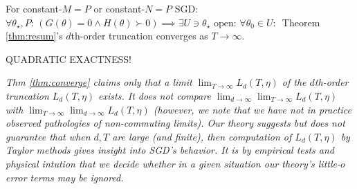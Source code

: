 {            %
            \begin{thm} \label{thm:converge}
                For constant-$M=P$ or constant-$N=P$ SGD:
                $\forall \theta_\star,P:\, (G(\theta)=0 \wedge H(\theta)\succ
                0) \implies \exists U\ni \theta_\star\,\,\text{open}:\, \forall
                \theta_0\in U:\,$
                Theorem \ref{thm:resum}'s $d$th-order truncation converges
                as $T\to \infty$.
            \end{thm}
            {\large\color{red}QUADRATIC EXACTNESS!}
            \begin{rmk}
                \emph{
                Thm \ref{thm:converge} claims only that a limit
                $\lim_{T\to\infty} L_d(T,\eta)$ of the
                $d$th-order truncation $L_d(T,\eta)$ exists.
                It does not compare $\lim_{d\to\infty}
                \lim_{T\to\infty} L_d(T,\eta)$ with $\lim_{T\to\infty}
                \lim_{d\to\infty} L_d(T,\eta)$ (however, we note that we have not in practice
                observed pathologies of non-commuting limits).
                Our theory suggests but does not guarantee that when $d, T$ are
                large (and finite), then computation of $L_d(T,\eta)$ by Taylor
                methods gives insight into SGD's behavior.  It is by empirical
                tests and physical intution that we decide whether in a given
                situation our theory's little-$o$ error terms may be ignored. 
                }
            \end{rmk}

}
